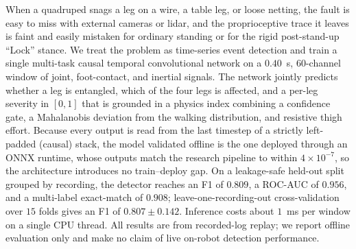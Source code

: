 When a quadruped snags a leg on a wire, a table leg, or loose netting, the fault is easy to miss with external cameras or lidar, and the proprioceptive trace it leaves is faint and easily mistaken for ordinary standing or for the rigid post-stand-up ``Lock'' stance. We treat the problem as time-series event detection and train a single multi-task causal temporal convolutional network on a $0.40$~s, $60$-channel window of joint, foot-contact, and inertial signals. The network jointly predicts whether a leg is entangled, which of the four legs is affected, and a per-leg severity in $[0,1]$ that is grounded in a physics index combining a confidence gate, a Mahalanobis deviation from the walking distribution, and resistive thigh effort. Because every output is read from the last timestep of a strictly left-padded (causal) stack, the model validated offline is the one deployed through an ONNX runtime, whose outputs match the research pipeline to within $4\times10^{-7}$, so the architecture introduces no train--deploy gap. On a leakage-safe held-out split grouped by recording, the detector reaches an F1 of $0.809$, a ROC-AUC of $0.956$, and a multi-label exact-match of $0.908$; leave-one-recording-out cross-validation over $15$ folds gives an F1 of $0.807 \pm 0.142$. Inference costs about $1$~ms per window on a single CPU thread. All results are from recorded-log replay; we report offline evaluation only and make no claim of live on-robot detection performance.

